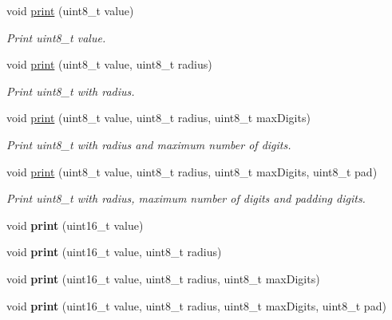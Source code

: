 \begin{DoxyCompactItemize}
void \hyperlink{class_l_k_m1638_board_a02dedfb608775b702d17e4d993006bec}{print} (uint8\+\_\+t value)
\begin{DoxyCompactList}\small\item\em Print uint8\+\_\+t value. \end{DoxyCompactList}\item 
void \hyperlink{class_l_k_m1638_board_a4c2dfa4e41c625419af04b23f67d55c0}{print} (uint8\+\_\+t value, uint8\+\_\+t radius)
\begin{DoxyCompactList}\small\item\em Print uint8\+\_\+t with radius. \end{DoxyCompactList}\item 
void \hyperlink{class_l_k_m1638_board_a162d7463e2a5a61c8d2688a0ccc2469f}{print} (uint8\+\_\+t value, uint8\+\_\+t radius, uint8\+\_\+t max\+Digits)
\begin{DoxyCompactList}\small\item\em Print uint8\+\_\+t with radius and maximum number of digits. \end{DoxyCompactList}\item 
void \hyperlink{class_l_k_m1638_board_ae38bc4ef7ce51c10adbf0a4708ee9f8d}{print} (uint8\+\_\+t value, uint8\+\_\+t radius, uint8\+\_\+t max\+Digits, uint8\+\_\+t pad)
\begin{DoxyCompactList}\small\item\em Print uint8\+\_\+t with radius, maximum number of digits and padding digits. \end{DoxyCompactList}\item 
void {\bfseries print} (uint16\+\_\+t value)\hypertarget{class_l_k_m1638_board_addb92b7db50eae92e3e5a493b2254e32}{}\label{class_l_k_m1638_board_addb92b7db50eae92e3e5a493b2254e32}

\item 
void {\bfseries print} (uint16\+\_\+t value, uint8\+\_\+t radius)\hypertarget{class_l_k_m1638_board_aa23737222e7b89c3788a0b989d875c8e}{}\label{class_l_k_m1638_board_aa23737222e7b89c3788a0b989d875c8e}

\item 
void {\bfseries print} (uint16\+\_\+t value, uint8\+\_\+t radius, uint8\+\_\+t max\+Digits)\hypertarget{class_l_k_m1638_board_a00a327012ce4139379fd7db2b9c18d46}{}\label{class_l_k_m1638_board_a00a327012ce4139379fd7db2b9c18d46}

\item 
void {\bfseries print} (uint16\+\_\+t value, uint8\+\_\+t radius, uint8\+\_\+t max\+Digits, uint8\+\_\+t pad)\hypertarget{class_l_k_m1638_board_ada91bebab1bbf9a0b49c2badbc719a23}{}\label{class_l_k_m1638_board_ada91bebab1bbf9a0b49c2badbc719a23}


\end{DoxyCompactItemize}
